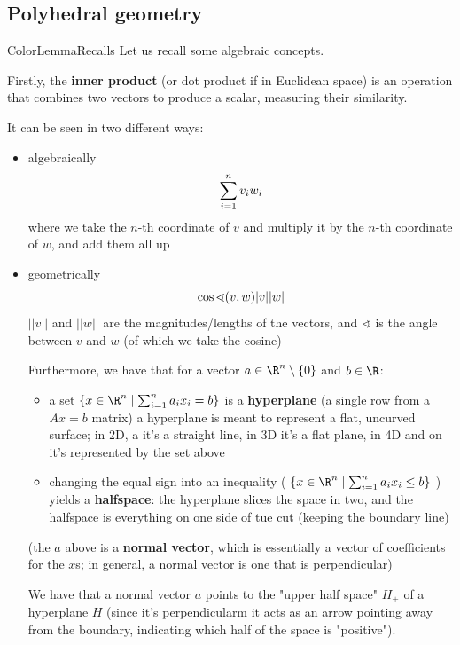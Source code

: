 \documentclass[a4paper, 11pt]{report}
\newcommand{\Rn}{\R^{n}}
\begin{document}
\subsection{Polyhedral geometry}
\begin{cframe}{ColorLemma}{Recalls}
Let us recall some algebraic concepts.

Firstly, the \textbf{inner product} (or dot product if in Euclidean space) is an operation that combines two vectors to produce a scalar, measuring their similarity.

It can be seen in two different ways:
\begin{itemize}
    \item algebraically
$$ \large \sum_{i=1}^n v_i w_i{}$$
\subitem where we take the $n$-th coordinate of $v$ and multiply it by the $n$-th coordinate of $w$, and add them all up

\item geometrically
$$\large \cos \sphericalangle(v,w) |v| |w|$$
\subitem $||v||$ and $||w||$ are the magnitudes/lengths of the vectors, and $\sphericalangle$ is the angle between $v$ and $w$ (of which we take the cosine)

Furthermore, we have that for a vector $a \in \Rn \setminus \{0\}$ and $b \in \R$:
\begin{itemize}
    \item a set $\{x \in \Rn \mid \sum_{i=1}^n a_i x_i = b \}$ is a \textbf{hyperplane} (a single row from a $Ax = b$ matrix)
        \subitem a hyperplane is meant to represent a flat, uncurved surface; in 2D, a it's a straight line, in 3D it's a flat plane, in 4D and on it's represented by the set above

    \item changing the equal sign into an inequality ( $\{x \in \Rn \mid \sum_{i=1}^n a_i x_i \leq  b \}$ ) yields a \textbf{halfspace}: the hyperplane slices the space in two, and the halfspace is everything on one side of tue cut (keeping the boundary line)
\end{itemize}

(the $a$ above is a \textbf{normal vector}, which is essentially a vector of coefficients for the $x$s; in general, a normal vector is one that is perpendicular)

We have that a normal vector $a$ points to the "upper half space" $H_{+}$ of a hyperplane $H$ (since it's perpendicularm it acts as an arrow pointing away from the boundary, indicating which half of the space is "positive").

\end{itemize}
\end{cframe}
\end{document}
